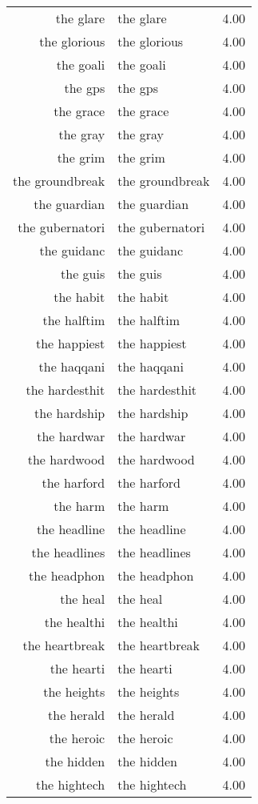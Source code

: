 \begin{table}[ht]
\begin{tabular}{rlr}
  the glare & the glare & 4.00 \\ 
  the glorious & the glorious & 4.00 \\ 
  the goali & the goali & 4.00 \\ 
  the gps & the gps & 4.00 \\ 
  the grace & the grace & 4.00 \\ 
  the gray & the gray & 4.00 \\ 
  the grim & the grim & 4.00 \\ 
  the groundbreak & the groundbreak & 4.00 \\ 
  the guardian & the guardian & 4.00 \\ 
  the gubernatori & the gubernatori & 4.00 \\ 
  the guidanc & the guidanc & 4.00 \\ 
  the guis & the guis & 4.00 \\ 
  the habit & the habit & 4.00 \\ 
  the halftim & the halftim & 4.00 \\ 
  the happiest & the happiest & 4.00 \\ 
  the haqqani & the haqqani & 4.00 \\ 
  the hardesthit & the hardesthit & 4.00 \\ 
  the hardship & the hardship & 4.00 \\ 
  the hardwar & the hardwar & 4.00 \\ 
  the hardwood & the hardwood & 4.00 \\ 
  the harford & the harford & 4.00 \\ 
  the harm & the harm & 4.00 \\ 
  the headline & the headline & 4.00 \\ 
  the headlines & the headlines & 4.00 \\ 
  the headphon & the headphon & 4.00 \\ 
  the heal & the heal & 4.00 \\ 
  the healthi & the healthi & 4.00 \\ 
  the heartbreak & the heartbreak & 4.00 \\ 
  the hearti & the hearti & 4.00 \\ 
  the heights & the heights & 4.00 \\ 
  the herald & the herald & 4.00 \\ 
  the heroic & the heroic & 4.00 \\ 
  the hidden & the hidden & 4.00 \\ 
  the hightech & the hightech & 4.00 \\ 

\end{tabular}
\end{table}
